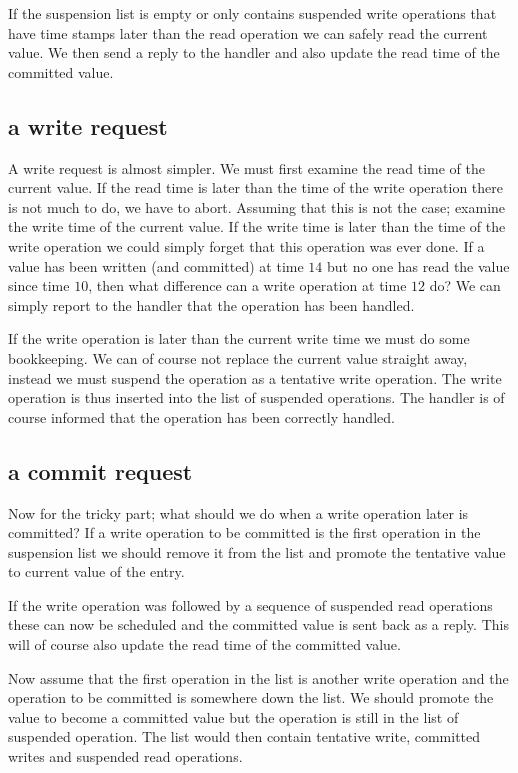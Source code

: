 \documentclass[a4paper, 11pt]{article}
\begin{document}
If the suspension list is empty or only contains suspended write
operations that have time stamps later than the read operation we can
safely read the current value. We then send a reply to the handler
and also update the read time of the committed value.

\subsection{a write request}

A write request is almost simpler. We must first examine the read
time of the current value. If the read time is later than the time of
the write operation there is not much to do, we have to
abort. Assuming that this is not the case; examine the write time of
the current value. If the write time is later than the time of the
write operation we could simply forget that this operation was ever
done. If a value has been written (and committed) at time $14$ but no
one has read the value since time $10$, then what difference can a
write operation at time $12$ do? We can simply report to the handler
that the operation has been handled.

If the write operation is later than the current write time we must do
some bookkeeping. We can of course not replace the current value
straight away, instead we must suspend the operation as a tentative
write operation. The write operation is thus inserted into the list of
suspended operations. The handler is of course informed that the
operation has been correctly handled.

\subsection{a commit request}

Now for the tricky part; what should we do when a write operation
later is committed? If a write operation to be committed is the first
operation in the suspension list we should remove it from the list and
promote the tentative value to current value of the entry. 

If the write operation was followed by a sequence of suspended read
operations these can now be scheduled and the committed value is sent
back as a reply. This will of course also update the read time of the
committed value.

Now assume that the first operation in the list is another write
operation and the operation to be committed is somewhere down the
list. We should promote the value to become a committed value but the
operation is still in the list of suspended operation. The list would
then contain tentative write, committed writes and suspended read
operations. 
\end{document}
